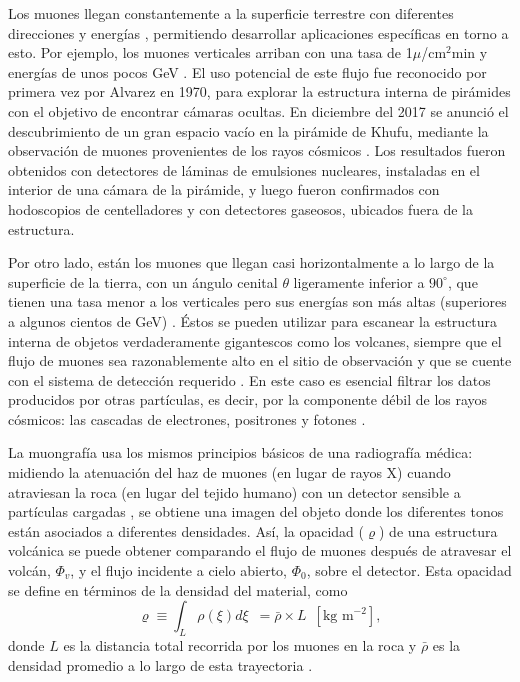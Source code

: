 \documentclass[12pt,oneside,openany,letter]{book}
\begin{document}
Los muones llegan constantemente a la superficie terrestre con diferentes direcciones y energ\'ias \cite{Asorey-phd2012}, permitiendo desarrollar aplicaciones espec\'ificas en torno a esto. Por ejemplo, los muones verticales arriban con una tasa de 1$\mu$/cm$^2$min y energ\'ias de unos pocos GeV \cite{nagamine_2003}. El uso potencial de este flujo fue reconocido por primera vez por Alvarez \cite{Alvarez-etal1970} en 1970,  para explorar la estructura interna de pir\'amides con el objetivo de encontrar cámaras ocultas. En diciembre del 2017 se anunci\'o el descubrimiento de un gran espacio vac\'io en la pir\'amide de Khufu, mediante la observaci\'on de muones provenientes de los rayos c\'osmicos \cite{morishima2017discovery}. Los resultados fueron obtenidos con detectores de l\'aminas de emulsiones nucleares, instaladas en el interior de una c\'amara de la pir\'amide, y luego fueron confirmados con hodoscopios de centelladores y con detectores gaseosos, ubicados fuera de la estructura. 

Por otro lado, est\'an los muones que llegan casi horizontalmente a lo largo de la superficie de la tierra, con un ángulo cenital $\theta$ ligeramente inferior a $90^{\circ}$, que tienen una tasa menor a los verticales pero sus energías son más altas (superiores a algunos cientos de GeV) \cite{nagamine_2003}. \'Estos se pueden utilizar para escanear la estructura interna de objetos verdaderamente gigantescos como los volcanes, siempre que el flujo de muones sea razonablemente alto en el sitio de observaci\'on y que se cuente con el sistema de detección requerido \cite{nagamine_2003}. En este caso es esencial filtrar los datos producidos por otras part\'iculas, es decir, por la componente débil de los rayos cósmicos: las cascadas de electrones, positrones y fotones \cite{nagamine_2003}.

La muongrafía usa los mismos principios básicos de una radiografía médica: midiendo la atenuación del haz de muones (en lugar de rayos X) cuando atraviesan la roca (en lugar del tejido humano) con un detector sensible a partículas cargadas \cite{Marteau-etal2012}, se obtiene una imagen del objeto donde los diferentes tonos están asociados a diferentes densidades. Así, la opacidad ($\varrho$) de una estructura volcánica se puede obtener comparando el flujo de muones después de atravesar el volcán, $\Phi_v$, y el flujo incidente a cielo abierto, $\Phi_0$, sobre el detector. Esta opacidad se define en t\'erminos de la densidad del material, como
\begin{equation}
\varrho \equiv \int_{L} \rho(\xi) d\xi \,\,\, = \bar{\rho}\times L \,\,\,  [\text{kg m}^{-2}],
\end{equation}
donde $L$ es la distancia total recorrida por los muones en la roca y $\bar{\rho}$ es la densidad promedio a lo largo de esta trayectoria \cite{Marteau-etal2012}.
\end{document}
